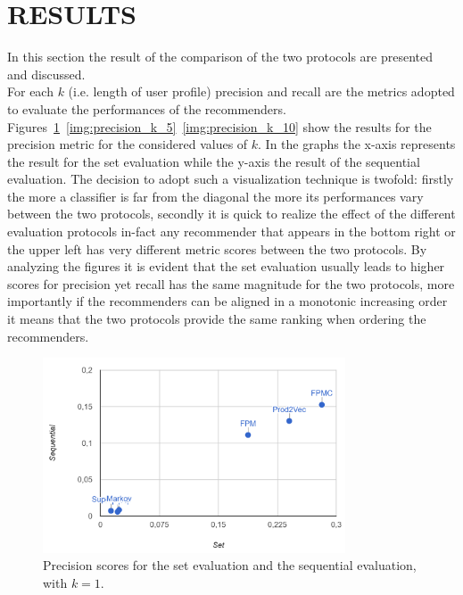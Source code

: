 \documentclass[prodmode,acmtecs]{acmsmall} %
\begin{document}
\section{RESULTS}
In this section the result of the comparison of the two protocols are presented and discussed.\\
For each $k$ (i.e. length of user profile) precision and recall are the metrics adopted to evaluate the performances of the recommenders.  
Figures~\ref{img:precision_k_1}~\ref{img:precision_k_5}~\ref{img:precision_k_10} show the results for the precision metric for the considered values of $k$. In the graphs the x-axis represents the result for the set evaluation while the y-axis the result of the sequential evaluation. The decision to adopt such a visualization technique is twofold: firstly the more a classifier is far from the diagonal the more its performances vary between the two protocols, secondly it is quick to realize the effect of the different evaluation protocols in-fact any recommender that appears in the bottom right or the upper left has very different metric scores between the two protocols. By analyzing the figures it is evident that the set evaluation usually leads to higher scores for precision yet recall has the same magnitude for the two protocols, more importantly if the recommenders can be aligned in  a monotonic increasing order it means that the two protocols provide the same ranking when ordering the recommenders.
\begin{figure}[H]
	\centering			
	\includegraphics[width=0.8\textwidth]{img/precision_k_1.png}
	\caption{Precision scores for the set evaluation and the sequential evaluation, with $k=1$.}
	\label{img:precision_k_1}
\end{figure}
\end{document}
